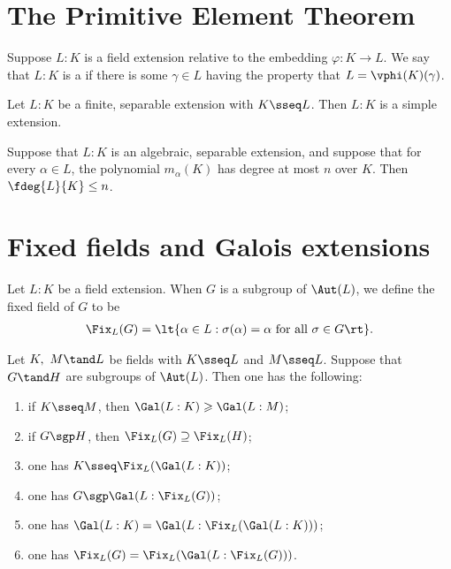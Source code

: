 \documentclass{article}
\begin{document}
\section{The Primitive Element Theorem}
  \begin{definition}
    Suppose $ L:K $ is a field extension relative to the embedding $ \varphi:K\to L $.
    We say that $ L:K $ is a  if there is some $ \gamma\in L $ having the property that $ L=\vphi(K)(\gamma) $.
  \end{definition}

  \begin{theorem}
    Let $ L:K $ be a finite, separable extension with $ K\sseq L $.
    Then $ L:K $ is a simple extension.
  \end{theorem}

  \begin{corollary}
    Suppose that $ L:K $ is an algebraic, separable extension, and suppose that for every $ \alpha\in L $, the polynomial $ m_\alpha(K) $ has degree at most $ n $ over $ K $.
    Then $ \fdeg{L}{K}\leq n $.
  \end{corollary}

\section{Fixed fields and Galois extensions}
  \begin{definition}
    Let $ L:K $ be a field extension.
    When $ G $ is a subgroup of $ \Aut(L) $, we define the fixed field of $ G $ to be \begin{align*}
      \Fix_L(G) = \lt\{ \alpha\in L : \sigma(\alpha) = \alpha \text{ for all } \sigma\in G \rt\}.
    \end{align*}
  \end{definition}

  \begin{proposition}
    Let $ K,\ M \tand L $ be fields with $ K\sseq L $ and $ M\sseq L $.
    Suppose that $ G\tand H $ are subgroups of $ \Aut(L) $.
    Then one has the following: \begin{enumerate}[label=(\alph*)]
      \item if $ K\sseq M $, then $ \Gal(L:K) \geqslant \Gal(L:M) $;
      \item if $ G\sgp H $, then $ \Fix_L(G)\supseteq \Fix_L(H) $;
      \item one has $ K\sseq \Fix_L(\Gal(L:K)) $;
      \item one has $ G\sgp\Gal(L:\Fix_L(G)) $;
      \item one has $ \Gal(L:K) = \Gal(L:\Fix_L(\Gal(L:K))) $;
      \item one has $ \Fix_L(G) = \Fix_L(\Gal(L:\Fix_L(G))) $.
    \end{enumerate}
  \end{proposition}
\end{document}
